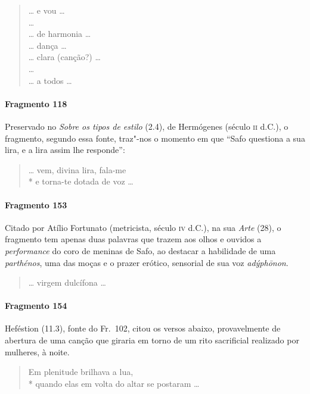 {\begin{verse}
\ldots{} e vou \ldots{}\\
\ldots{}\\
\ldots{} de harmonia \ldots{}\\
\ldots{} dança \ldots{}\\
\ldots{} clara (canção?) \ldots{}\\
\ldots{}\\
\ldots{} a todos \ldots{} 
\end{verse}


\paragraph{Fragmento 118}

{\small Preservado no \textit{Sobre os tipos de estilo} (2.4), de Hermógenes (século \textsc{ii} d.C.),
o fragmento, segundo essa fonte, traz"-nos o momento em que ``Safo
questiona a sua lira, e a lira assim lhe responde”:}

\begin{verse}
\ldots{} vem, divina lira, fala-me\\*
e torna-te dotada de voz \ldots{}
\end{verse}

\paragraph{Fragmento 153}

{\small Citado por Atílio Fortunato (metricista, século \textsc{iv} d.C.), na sua \textit{Arte} (28), o fragmento tem apenas duas palavras que trazem aos olhos e ouvidos a \textit{performance} do coro de meninas de Safo, ao destacar a habilidade de uma \textit{parthénos}, uma das moças e o prazer erótico, sensorial de sua voz \textit{adýphōnon}.}

\begin{verse}
\ldots{} virgem dulcífona \ldots{}
\end{verse}


\paragraph{Fragmento 154}

{\small Heféstion (11.3), fonte do Fr.~102, citou os versos abaixo, provavelmente de abertura
de uma canção que giraria em torno de um rito sacrificial realizado
por mulheres, à noite.}

\begin{verse}
Em plenitude brilhava a lua, \\*
quando elas em volta do altar se postaram \ldots{}
\end{verse}

}
